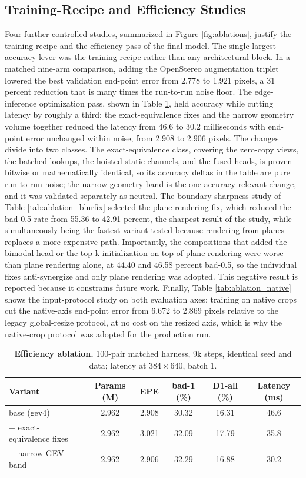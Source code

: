 \subsection{Training-Recipe and Efficiency Studies}
Four further controlled studies, summarized in Figure \ref{fig:ablations},
justify the training recipe and the efficiency
pass of the final model. The single largest accuracy lever was
the training recipe rather than any architectural block. In a matched
nine-arm comparison, adding the OpenStereo augmentation triplet lowered the
best validation end-point error from 2.778 to 1.921 pixels, a 31 percent
reduction that is many times the run-to-run noise floor. The
edge-inference optimization pass, shown in Table
\ref{tab:ablation_efficiency}, held accuracy while cutting latency by
roughly a third: the exact-equivalence fixes and the narrow geometry
volume together reduced the latency from 46.6 to 30.2 milliseconds with
end-point error unchanged within noise, from 2.908 to 2.906 pixels. The changes divide into two classes. The
exact-equivalence class, covering the zero-copy views, the batched
lookups, the hoisted static channels, and the fused heads, is proven
bitwise or mathematically identical, so its accuracy deltas in the table
are pure run-to-run noise; the narrow geometry band is the one
accuracy-relevant change, and it was validated separately as neutral.
The boundary-sharpness study of Table \ref{tab:ablation_blurfix} selected
the plane-rendering fix, which reduced the bad-0.5 rate from 55.36 to
42.91 percent, the sharpest result of the study, while simultaneously
being the fastest variant tested because rendering from planes replaces
a more expensive path. Importantly, the compositions
that added the bimodal head or the top-k initialization on top of plane
rendering were worse than plane rendering alone, at 44.40 and 46.58
percent bad-0.5, so the individual fixes anti-synergize and only plane
rendering was adopted. This negative result is reported because it
constrains future work. Finally, Table \ref{tab:ablation_native} shows the
input-protocol study on both evaluation axes: training on native crops cut
the native-axis end-point error from 6.672 to 2.869 pixels relative to the
legacy global-resize protocol, at no cost on the resized axis, which is
why the native-crop protocol was adopted for the production run.

\begin{table}[!htbp]
\centering
\caption{\textbf{Efficiency ablation.} 100-pair matched harness, 9k steps, identical seed and data; latency at $384\times 640$, batch 1.}
\label{tab:ablation_efficiency}
\small
\begin{tabular}{lccccc}
\toprule
Variant & Params (M) & EPE & bad-1 (\%) & D1-all (\%) & Latency (ms)\\
\midrule
base (gev4) & 2.962 & 2.908 & 30.32 & 16.31 & 46.6\\
+ exact-equivalence fixes & 2.962 & 3.021 & 32.09 & 17.79 & 35.8\\
+ narrow GEV band & 2.962 & 2.906 & 32.29 & 16.88 & 30.2\\
\bottomrule
\end{tabular}
\end{table}

